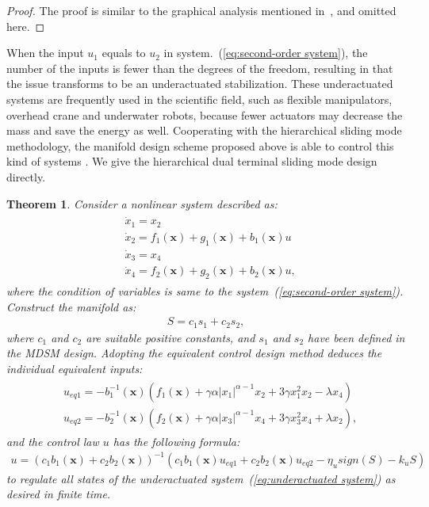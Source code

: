 \documentclass[3p]{elsarticle}
\theoremstyle{plain}
\newtheorem{mythm}{Theorem}
\theoremstyle{remark}
\begin{document}
\begin{proof}
The proof is similar to the graphical analysis mentioned in~\cite{feng2013nonsingular}, and omitted here.
\end{proof}
When the input $u_1$ equals to $u_2$ in system.~(\ref{eq:second-order system}), the number of the inputs is fewer than the degrees of the freedom, resulting in that the issue transforms to be an underactuated stabilization. These underactuated systems are frequently used in the scientific field, such as flexible manipulators, overhead crane and underwater robots, because fewer actuators may decrease the mass and save the energy as well. Cooperating with the hierarchical sliding mode methodology, the manifold design scheme proposed above is able to control this kind of systems \cite{wang2004design}. We give the hierarchical dual terminal sliding mode design directly.
\begin{mythm}
Consider a nonlinear system described as:
\begin{align}
\begin{split}
&\dot x_1 = x_2\\
&\dot x_2 = f_1(\bm x) + g_1(\bm x)+b_1(\bm x)u\\
&\dot x_3 = x_4\\
&\dot x_4 = f_2(\bm x) + g_2(\bm x)+b_2(\bm x)u,\label{eq:underactuated system}
\end{split}
\end{align}
where the condition of variables is same to the system~(\ref{eq:second-order system}). Construct the manifold as:
\begin{align}
S = c_1s_1+c_2s_2,
\end{align}
where $c_1$ and $c_2$ are suitable positive constants, and $s_1$ and $s_2$ have been defined in the MDSM design. Adopting the equivalent control design method deduces the individual equivalent inputs:
\begin{align}
\begin{split}
&u_{eq1} = -b_1^{-1}(\bm x)(f_1(\bm x)+\gamma\alpha\vert x_1\vert^{\alpha-1}x_2+3\gamma x_1^2x_2-\lambda x_4)\\
&u_{eq2} = -b_2^{-1}(\bm x)(f_2(\bm x)+\gamma\alpha\vert x_3\vert^{\alpha-1}x_4+3\gamma x_3^2x_4+\lambda x_2),
\end{split}
\end{align}
and the control law $u$ has the following formula:
\begin{align}
u = (c_1b_1(\bm x)+c_2b_2(\bm x))^{-1}(c_1b_1(\bm x)u_{eq1}+c_2b_2(\bm x)u_{eq2}-\eta_u sign(S)-k_u S)\label{eq:underactuated input}
\end{align}
to regulate all states of the underactuated system~(\ref{eq:underactuated system}) as desired in finite time.
\end{mythm}
\end{document}
